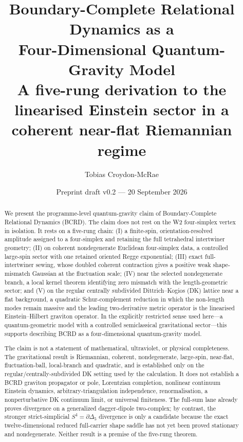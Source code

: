\documentclass[11pt]{article}
\title{\textbf{Boundary-Complete Relational Dynamics as a\\Four-Dimensional Quantum-Gravity Model}\\[0.5em]
\large A five-rung derivation to the linearised Einstein sector in a coherent near-flat Riemannian regime}
\author{Tobias Croydon-McRae}
\affil{Independent researcher, Aotearoa New Zealand}
\date{Preprint draft v0.2 --- 20 September 2026}
\numberwithin{equation}{section}
\begin{document}
\maketitle

\begin{abstract}
We present the programme-level quantum-gravity claim of Boundary-Complete Relational Dynamics (BCRD). The claim does not rest on the W2 four-simplex vertex in isolation. It rests on a five-rung chain: (I) a finite-spin, orientation-resolved amplitude assigned to a four-simplex and retaining the full tetrahedral intertwiner geometry; (II) on coherent nondegenerate Euclidean four-simplex data, a controlled large-spin sector with one retained oriented Regge exponential; (III) exact full-intertwiner sewing, whose doubled coherent contraction gives a positive weak shape-mismatch Gaussian at the fluctuation scale; (IV) near the selected nondegenerate branch, a local kernel theorem identifying zero mismatch with the length-geometric sector; and (V) on the regular centrally subdivided Dittrich--Kogios (DK) lattice near a flat background, a quadratic Schur-complement reduction in which the non-length modes remain massive and the leading two-derivative metric operator is the linearised Einstein--Hilbert graviton operator. In the explicitly restricted sense used here---a quantum-geometric model with a controlled semiclassical gravitational sector---this supports describing BCRD as a four-dimensional quantum-gravity model.

The claim is not a statement of mathematical, ultraviolet, or physical completeness. The gravitational result is Riemannian, coherent, nondegenerate, large-spin, near-flat, fluctuation-ball, local-branch and quadratic, and is established only on the regular/centrally-subdivided DK setting used by the calculation. It does not establish a BCRD graviton propagator or pole, Lorentzian completion, nonlinear continuum Einstein dynamics, arbitrary-triangulation independence, renormalisation, a nonperturbative DK continuum limit, or universal finiteness. The full-sum lane already proves divergence on a generalized dagger-dipole two-complex; by contrast, the stronger strict-simplicial $S^4=\partial\Delta_5$ divergence is only a candidate because the exact twelve-dimensional reduced full-carrier shape saddle has not yet been proved stationary and nondegenerate. Neither result is a premise of the five-rung theorem.
\end{abstract}

\tableofcontents
\end{document}
